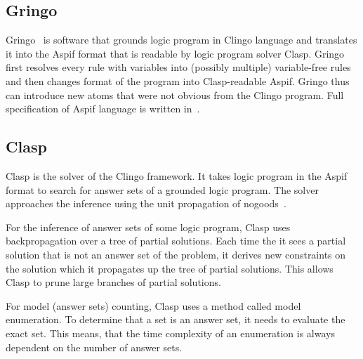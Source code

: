 \subsection{Gringo}

Gringo~\cite{GebserKKS17} is software that grounds logic program in Clingo language
and translates it into the Aspif format that is readable by logic program solver Clasp.
Gringo first resolves every rule with variables
into (possibly multiple) variable-free rules and then changes format of
the program into Clasp-readable Aspif. Gringo thus can introduce new atoms
that were not obvious from the Clingo program. Full specification of Aspif language
is written in~\cite{aspEasy2016}.
\newcommand{\ms}{\texttt{ }}

\subsection{Clasp}\label{sec:clasp}

Clasp is the solver of the Clingo framework. It takes logic program in the Aspif
format to search for answer sets of a grounded logic program.
The solver approaches the inference using the unit propagation
of nogoods~\cite{DBLP:journals/ai/GebserKS12}.

For the inference of answer sets of some logic program,
Clasp uses backpropagation over a tree of partial solutions.
Each time the it sees a partial solution that is not an answer set
of the problem, it derives new constraints on the solution which it
propagates up the tree of partial solutions. This allows Clasp
to prune large branches of partial solutions.

For model (answer sets) counting, Clasp uses a method
called model enumeration. To determine that a set is an answer set,
it needs to evaluate the exact set. This means, that the time complexity
of an enumeration is always dependent on the number of answer sets.
